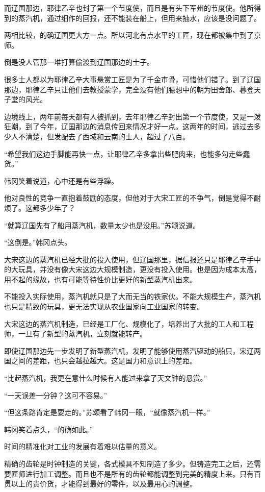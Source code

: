 而辽国那边，耶律乙辛也封了第一个节度使，而且是有头下军州的节度使。他所得到的蒸汽机，通过细作的回报，还不能装在船上，但用来抽水，应该是没问题了。

两相比较，的确辽国更大方一点。所以河北有点水平的工匠，现在都被集中到了京师。

倒是没人管那一堆打算偷渡到辽国那边的士子。

很多士人都以为耶律乙辛大事悬赏工匠是为了千金市骨，可惜他们错了。到了辽国那边，耶律乙辛只让他们去教授蒙学，完全没有他们臆想中的朝为田舍郎、暮登天子堂的风光。

边境线上，两年前每天都有人被抓到，去年耶律乙辛封出第一个节度使，又是一泼狂潮，到了今年，辽国那边的消息传回来情况才好一点。这两年的时间，逃过去多少人不清楚，但发配去了西域和云南的士人，超过了八百。

“希望我们这边手脚能再快一点，让耶律乙辛多拿出些肥肉来，也能多勾走些蠢货。”

韩冈笑着说道，心中还是有些浮躁。

他对良性的竞争一直抱着鼓励的态度，但他对于大宋工匠的不争气，倒是觉得不耐烦了。这都多少年了？

“就算辽国先有了船用蒸汽机，数量太少也是没用。”苏颂说道。

“这倒是。”韩冈点头。

大宋这边的蒸汽机已经大批的投入使用，但辽国那里，据信报还只是耶律乙辛手中的大玩具，并没有像大宋这边大规模制造，更没有投入使用。也是因为成本太高，用不起的缘故，也有可能等待性价比更好的新型蒸汽机出来。

不能投入实际使用，蒸汽机就只是了大而无当的铁家伙。不能大规模生产，蒸汽机也只是精致的玩具，更无法实现从农业国家向工业国家的转变。

大宋这边的蒸汽机制造，已经是工厂化、规模化了，培养出了大批的工人和工程师，一旦有了新型的蒸汽机，立刻就能转产。

即使辽国那边先一步发明了新型蒸汽机，发明了能够使用蒸汽驱动的船只，宋辽两国之间的差距，也只会越拉越大。这是国力和意识上的差距。

“比起蒸汽机，我更在意什么时候有人能过来拿了天文钟的悬赏。”

“一天误差一分钟？这可不容易。”

“但这条路肯定是要走的。”苏颂看了韩冈一眼，“就像蒸汽机一样。”

韩冈笑着点头，“的确如此。”

时间的精准化对工业的发展有着难以估量的意义。

精确的齿轮是时钟制造的关键，各式模具不知制造了多少。但铸造完工之后，还需要匠师进行加工调整。而且也不是所有的齿轮都能调整到完美的精度上来。只有百贯以上的贵价货，才能得到最好的零件，以及最用心的调整。

